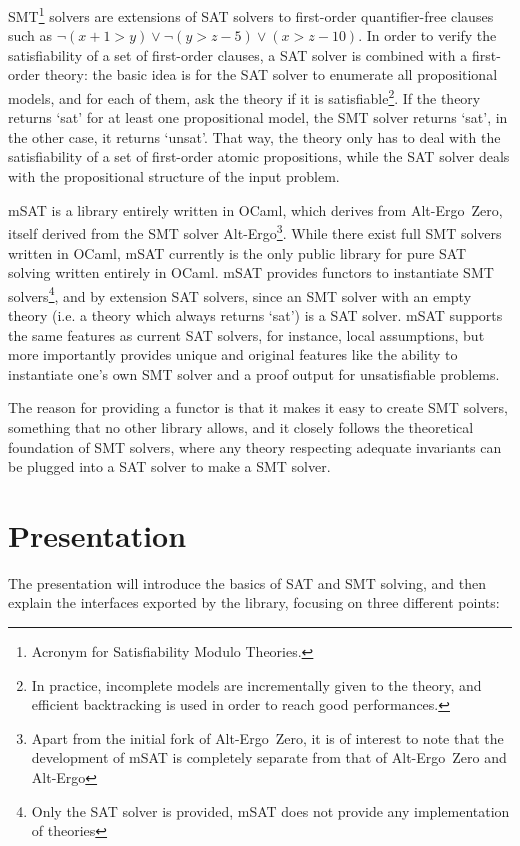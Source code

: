 \documentclass{llncs}
\def\aez{\textsf{Alt-Ergo~Zero}}
\def\altergo{\textsf{Alt-Ergo}}
\def\msat{\textsf{mSAT}}
\begin{document}
SMT\footnote{Acronym for Satisfiability Modulo Theories.} solvers are extensions
of SAT solvers to first-order quantifier-free clauses such as
$\neg (x + 1 > y) \lor \neg (y > z - 5) \lor (x > z - 10)$. In order to verify
the satisfiability of a set of first-order clauses, a SAT solver is combined
with a first-order theory: the basic idea is for the SAT solver to enumerate
all propositional models, and for each of them, ask the theory if it is
satisfiable\footnote{In practice, incomplete models are incrementally given to
the theory, and efficient backtracking is used in order to reach good
performances.}. If the theory returns `sat' for at least one propositional model,
the SMT solver returns `sat', in the other case, it returns `unsat'. That way,
the theory only has to deal with the satisfiability of a set of first-order
atomic propositions, while the SAT solver deals with the propositional structure
of the input problem.

\msat{}\cite{msat} is a library entirely written in OCaml, which derives from
\aez{}\cite{aez}, itself derived from the SMT solver
\altergo{}\cite{altergo}\footnote{Apart from the initial fork of \aez{}, it is of
interest to note that the development of \msat{} is completely separate from
that of \aez{} and \altergo{}}. While there exist full SMT solvers written in
OCaml, \msat{} currently is the only public library for pure SAT solving written
entirely in OCaml.
\msat{} provides functors to instantiate SMT solvers\footnote{Only the SAT
solver is provided, \msat{} does not provide any implementation of theories},
and by extension SAT solvers, since an SMT solver with an empty theory (i.e. a
theory which always returns `sat') is a SAT solver. \msat{} supports the same
features as current SAT solvers, for instance, local assumptions, but more
importantly provides unique and original features like the ability to
instantiate one's own SMT solver and a proof output for unsatisfiable problems.

The reason for providing a functor is that it makes it easy to create SMT
solvers, something that no other library allows, and it closely follows the
theoretical foundation of SMT solvers, where any theory respecting adequate
invariants can be plugged into a SAT solver to make a SMT solver.

\section*{Presentation}

The presentation will introduce the basics of SAT and SMT solving, and then
explain the interfaces exported by the library, focusing on three different
points:
\end{document}

